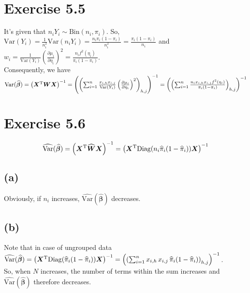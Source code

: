 \documentclass[a4paper]{article}
\newcommand{\Var}{\mathrm{Var}}
\begin{document}
\vspace{\baselineskip}
\section{Exercise 5.5}
It's given that $n_{i}Y_{i} \sim \mathrm{Bin}(n_{i}, \pi_{i})$. So, $\Var(Y_{i}) = \frac{1}{n_{i}^{2}}\Var(n_{i}Y_{i}) = \frac{n_{i}\pi_{i}(1-\pi_{i})}{n_{i}^{2}} = \frac{\pi_{i}(1-\pi_{i})}{n_{i}}$ and $w_{i} = \frac{1}{\Var(Y_{i})}\left(\frac{\partial \mu_{i}}{\partial \eta_{i}}\right)^{2} = \frac{n_{i} f^{2}(\eta_{i})}{\pi_{i}(1-\pi_{i})}$.\\
Consequently, we have $\Var(\widehat{\bm{\beta}}) = \left(\bm{X}^{\rm T}\bm{W}\bm{X}\right)^{-1} = \left(\left(\sum_{i=1}^{n} \frac{x_{i,h}x_{i,j}}{\Var(Y_{i})}\left(\frac{\partial \mu_{i}}{\partial \eta_{i}}\right)^{2} \right)_{h,j}\right)^{-1} = \left(\left(\sum_{i=1}^{n} \frac{n_{i} x_{i,h}x_{i,j}f^{2}(\eta_{i})}{\pi_{i}(1-\pi_{i})} \right)_{h,j}\right)^{-1}$


\vspace{\baselineskip}
\section{Exercise 5.6}
\begin{align*}
\widehat{\Var}(\widehat{\bm{\beta}}) = \left(\bm{X}^{\rm T}\widehat{\bm{W}}\bm{X}\right)^{-1} = \left(\bm{X}^{\rm T}\mathrm{Diag}(n_{i}\widehat{\pi}_{i}(1-\widehat{\pi}_{i}))\bm{X}\right)^{-1}
\end{align*}

\subsection{(a)}
Obviously, if $n_{i}$ increases, $\widehat{\Var}(\widehat{\bm{\beta}})$ decreases. 

\subsection{(b)}
Note that in case of ungrouped data $\widehat{\Var}(\widehat{\bm{\beta}}) = \left(\bm{X}^{\rm T}\mathrm{Diag}(\widehat{\pi}_{i}(1-\widehat{\pi}_{i}))\bm{X}\right)^{-1} = \left(\left(\sum_{i=1}^{n} x_{i,h} \, x_{i,j} \, \widehat{\pi}_{i}(1-\widehat{\pi}_{i})\right)_{h,j}\right)^{-1}$.\\
So, when $N$ increases, the number of terms within the sum increases and $\widehat{\Var}(\widehat{\bm{\beta}})$ therefore decreases.
\end{document}
